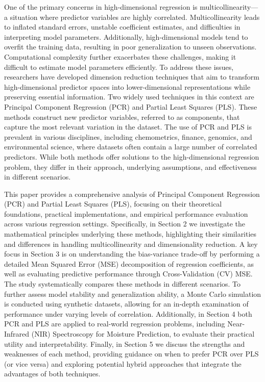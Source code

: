 \documentclass[11pt,twoside,a4paper]{article}
\begin{document}
One of the primary concerns in high-dimensional regression is multicollinearity—a situation where predictor variables are highly correlated. Multicollinearity leads to inflated standard errors, unstable coefficient estimates, and difficulties in interpreting model parameters. Additionally, high-dimensional models tend to overfit the training data, resulting in poor generalization to unseen observations. Computational complexity further exacerbates these challenges, making it difficult to estimate model parameters efficiently.
To address these issues, researchers have developed dimension reduction techniques that aim to transform high-dimensional predictor spaces into lower-dimensional representations while preserving essential information. Two widely used techniques in this context are Principal Component Regression (PCR) and Partial Least Squares (PLS). These methods construct new predictor variables, referred to as components, that capture the most relevant variation in the dataset.
The use of PCR and PLS is prevalent in various disciplines, including chemometrics, finance, genomics, and environmental science, where datasets often contain a large number of correlated predictors. While both methods offer solutions to the high-dimensional regression problem, they differ in their approach, underlying assumptions, and effectiveness in different scenarios.

This paper provides a comprehensive analysis of  Principal Component Regression (PCR) and Partial Least Squares (PLS), focusing on their theoretical foundations, practical implementations, and empirical performance evaluation across various regression settings. Specifically, in Section 2 we investigate the mathematical principles underlying these methods, highlighting their similarities and differences in handling multicollinearity and dimensionality reduction. A key focus in Section 3 is on understanding the bias-variance trade-off by performing a detailed Mean Squared Error (MSE) decomposition of regression coefficients, as well as evaluating predictive performance through Cross-Validation (CV) MSE. The study systematically compares these methods in different scenarios. To further assess model stability and generalization ability, a Monte Carlo simulation is conducted using synthetic datasets, allowing for an in-depth examination of performance under varying levels of correlation. Additionally, in Section 4 both PCR and PLS are applied to real-world regression problems, including Near-Infrared (NIR) Spectroscopy for Moisture Prediction, to evaluate their practical utility and interpretability. Finally, in Section 5 we discuss the strengths and weaknesses of each method, providing guidance on when to prefer PCR over PLS (or vice versa) and exploring potential hybrid approaches that integrate the advantages of both techniques.
\newpage
\end{document}
